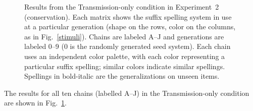 \documentclass[doc,biblatex]{apa7}
\begin{document}
	\begin{figure}
	\vspace*{2pt}
	\caption{Results from the Transmission-only condition in Experiment~2 (conservation). Each matrix shows the suffix spelling system in use at a particular generation (shape on the rows, color on the columns, as in Fig.~\ref{stimuli}). Chains are labeled A--J and generations are labeled 0–9 (0 is the randomly generated seed system). Each chain uses an independent color palette, with each color representing a particular suffix spelling; similar colors indicate similar spellings. Spellings in bold-italic are the generalizations on unseen items.}
	\label{con_lrn}
	\end{figure}

The results for all ten chains (labelled A--J) in the Transmission-only condition are shown in Fig.~\ref{con_lrn}.
\end{document}
